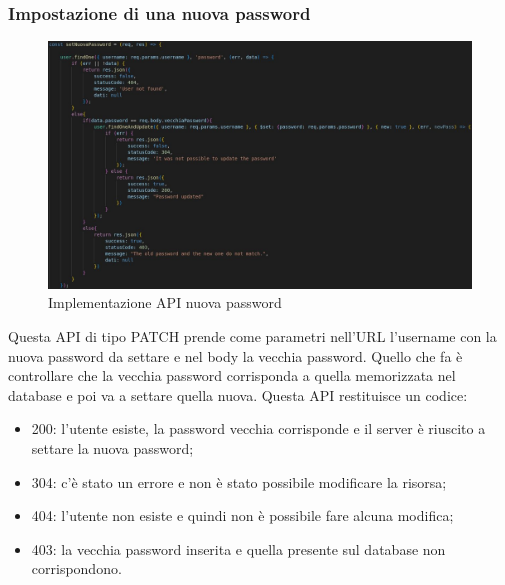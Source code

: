 \subsubsection{Impostazione di una nuova password}
\begin{figure}[!h]
\centering
\includegraphics[scale=0.4]{images/api_nuova_password.jpg}
\caption{Implementazione API nuova password}
\label{fig:api_nuova_password}
\end{figure}
\noindent
Questa API di tipo PATCH prende come parametri nell'URL l'username con la nuova password da settare e nel body la vecchia password. Quello che fa è controllare che la vecchia password corrisponda a quella memorizzata nel database e poi va a settare quella nuova.
Questa API restituisce un codice:
\begin{itemize}
    \item 200: l'utente esiste, la password vecchia corrisponde e il server è riuscito a settare la nuova password;
    \item 304: c'è stato un errore e non è stato possibile modificare la risorsa;
    \item 404: l'utente non esiste e quindi non è possibile fare alcuna modifica;
    \item 403: la vecchia password inserita e quella presente sul database non corrispondono.
\end{itemize}

